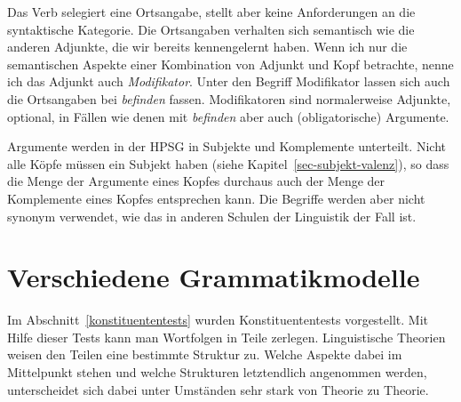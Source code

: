 Das Verb selegiert eine Ortsangabe, stellt aber keine Anforderungen an die syntaktische
Kategorie. Die Ortsangaben verhalten sich semantisch wie die anderen Adjunkte, die wir bereits
kennengelernt haben. Wenn ich nur die semantischen Aspekte einer Kombination von Adjunkt und Kopf
betrachte, nenne ich das Adjunkt auch \emph{Modifikator}. Unter den Begriff Modifikator lassen sich
auch die Ortsangaben bei \emph{befinden} fassen.
Modifikatoren sind normalerweise Adjunkte, \dash optional, in Fällen wie denen mit \emph{befinden} aber auch
(obligatorische) Argumente.

Argumente werden in der HPSG in Subjekte und Komplemente
unterteilt. Nicht alle Köpfe müssen ein Subjekt haben (siehe Kapitel~\ref{sec-subjekt-valenz}),
so dass die Menge der Argumente eines Kopfes durchaus auch der Menge der Komplemente eines Kopfes entsprechen
kann. Die Begriffe werden aber nicht synonym verwendet, wie das in anderen Schulen
der Linguistik der Fall ist.
{}



\section{Verschiedene Grammatikmodelle}
\label{sec-grammatikmodelle}

Im Abschnitt~\ref{konstituententests} wurden Konstituententests vorgestellt. Mit Hilfe dieser Tests kann
man Wortfolgen in Teile zerlegen. Linguistische Theorien weisen den Teilen eine bestimmte
Struktur zu. Welche Aspekte dabei im Mittelpunkt stehen und welche Strukturen letztendlich
angenommen werden, unterscheidet sich dabei unter Umständen sehr stark von Theorie zu Theorie.

